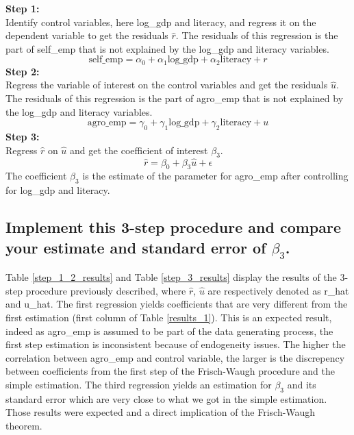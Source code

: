 \textbf{Step 1:}\\
Identify control variables, here log\_gdp and literacy, and regress it on the dependent variable to get the residuals $\hat{r}$. The residuals of this regression is the part of self\_emp that is not explained by the log\_gdp and literacy variables.
\begin{equation*}
  \text{self\_emp} = \alpha_0 + \alpha_1 \text{log\_gdp} + \alpha_2 \text{literacy} + r 
\end{equation*}
\textbf{Step 2:}\\
Regress the variable of interest on the control variables and get the residuals $\hat{u}$. The residuals of this regression is the part of agro\_emp that is not explained by the log\_gdp and literacy variables.
\begin{equation*}
  \text{agro\_emp} = \gamma_0 + \gamma_1 \text{log\_gdp} + \gamma_2 \text{literacy} + u 
\end{equation*}
\textbf{Step 3:}\\
Regress $\hat{r}$ on $\hat{u}$ and get the coefficient of interest $\beta_3$. 
\begin{equation*}
  \hat{r} = \beta_0 + \beta_3 \hat{u} + \epsilon
\end{equation*}
The coefficient $\beta_3$ is the estimate of the parameter for agro\_emp after controlling for log\_gdp and literacy.

\subsection{Implement this 3-step procedure and compare your estimate and standard error of $\beta_3$.}
Table \ref{step_1_2_results} and Table \ref{step_3_results} display the results of the 3-step
procedure previously described,
where $\hat{r}$, $\hat{u}$ are respectively denoted as r\_hat and u\_hat.
The first regression yields coefficients that are very different from the first estimation (first column of Table \ref{results_1}).
This is an expected result, indeed as agro\_emp is assumed to be part of the data generating process,
the first step estimation is inconsistent because of endogeneity issues.
The higher the correlation between agro\_emp and control variable, the larger is the discrepency between coefficients from the first step of the Frisch-Waugh procedure and the simple estimation.
The third regression yields an estimation for $\beta_3$ and its standard error which are very close to what we got in the simple estimation.
Those results were expected and a direct implication of the Frisch-Waugh theorem. 



